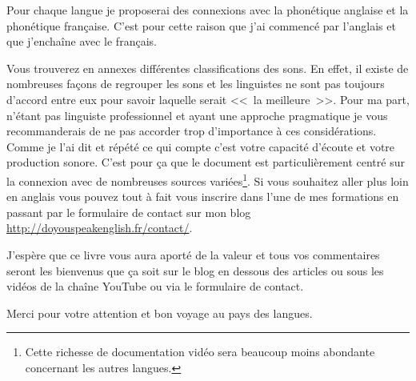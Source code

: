 Pour chaque langue je proposerai des connexions avec la phonétique
anglaise et la phonétique française. C'est pour cette raison que j'ai
commencé par l'anglais et que j'enchaîne avec le français.

Vous trouverez en annexes différentes classifications des sons. En
effet, il existe de nombreuses façons de regrouper les sons et les
linguistes ne sont pas toujours d'accord entre eux pour savoir
laquelle serait <<~la meilleure~>>. Pour ma part, n'étant pas
linguiste professionnel et ayant une approche pragmatique je vous
recommanderais de ne pas accorder trop d'importance à ces
considérations. Comme je l'ai dit et répété ce qui compte c'est votre
capacité d'écoute et votre production sonore. C'est pour ça que le
document est particulièrement centré sur la connexion avec de
nombreuses sources variées\footnote{Cette richesse de documentation
  vidéo sera beaucoup moins abondante concernant les autres
  langues.}.
Si vous souhaitez aller plus loin en anglais vous pouvez tout à fait
vous inscrire dans l'une de mes formations en passant par le
formulaire de contact sur mon blog
\url{http://doyouspeakenglish.fr/contact/}.

J'espère que ce livre vous aura aporté de la valeur et tous vos
commentaires seront les bienvenus que ça soit sur le blog en dessous
des articles ou sous les vidéos de la chaîne YouTube ou via le
formulaire de contact.

Merci pour votre attention et bon voyage au pays des langues.